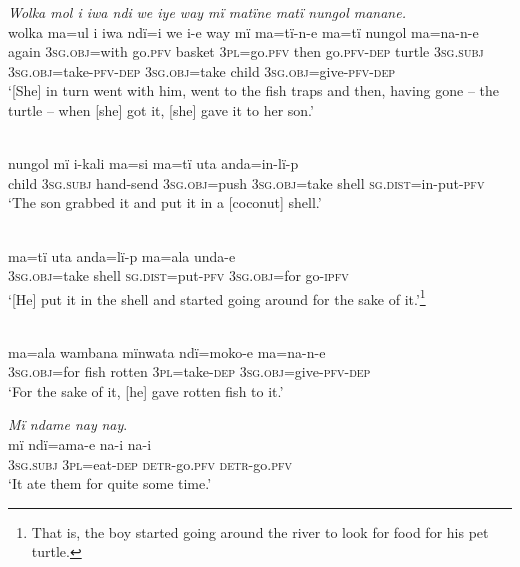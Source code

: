 \ex \textit{Wolka mol i iwa nd}{\textit{i}} \textit{we iye way mï matïne matï nungol manane.}\\
\gll wolka  m{a=u}l      i    iwa      ndï={i} we    i-e  way  mï      ma{=}tï{{}-}n{{}-}e          ma{=}tï      nungol ma{=}na-n{{}-}e\\
again  3\textsc{sg.obj}=with  go.\textsc{pfv}  basket  3\textsc{pl}=go.\textsc{pfv}  then  go.\textsc{pfv-dep} turtle  3\textsc{sg.subj}  3\textsc{sg.obj}=take-\textsc{pfv-dep}  3\textsc{sg.obj}=take  child 3\textsc{sg.obj}=give-\textsc{pfv-dep}\\
\glt ‘[She] in turn went with him, went to the fish traps and then, having gone -- the turtle -- when [she] got it, [she] gave it to her son.’

\newpage

\\
\gll nungol  mï      i-kali    ma=si      ma=tï      uta anda=in-lï-p\\
child  3\textsc{sg.subj}  hand-send  3\textsc{sg.obj}=push  3\textsc{sg.obj}=take  shell \textsc{sg.dist}=in-put-\textsc{pfv}\\
\glt ‘The son grabbed it and put it in a [coconut] shell.’

\\
\gll ma{=}tï      uta    anda{=}lï{{}-}p      ma={a}la    unda-e\\
3\textsc{sg.obj}=take  shell  \textsc{sg.dist}=put-\textsc{pfv}  3\textsc{sg.obj}=for  go-\textsc{ipfv}\\
\glt ‘[He] put it in the shell and started going around for the sake of it.’\footnote{That is, the boy started going around the river to look for food for his pet turtle.}

\\
\gll ma=ala    wambana  mïnwata  ndï{=}moko-e  ma{=}na-n{{}-}e\\
3\textsc{sg.obj=}for  fish    rotten    3\textsc{pl}=take-\textsc{dep}  \textsc{3sg.obj}=give-\textsc{pfv-dep}\\
\glt ‘For the sake of it, [he] gave rotten fish to it.’

\ex \textit{Mï ndame n}{\textit{ay}} \textit{n}{\textit{ay}}.\\
\gll mï      ndï={a}ma-e    n{a-i} n{a-i}\\
3\textsc{sg.subj}  \textsc{3pl}=eat-\textsc{dep}  \textsc{detr}{}-go.\textsc{pfv}  \textsc{detr-}go.\textsc{pfv}\\
\glt ‘It ate them for quite some time.’

